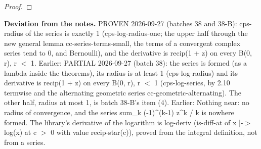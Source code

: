 \begin{proof}
%
%
\end{proof}
%
\noindent\textbf{Deviation from the notes.} PROVEN 2026-09-27 (batches 38 and 38-B): cps-radius of the series is exactly 1 (cps-log-radius-one; the upper half through the new general lemma cc-series-terms-small, the terms of a convergent complex series tend to 0, and Bernoulli), and the derivative is recip(1 + z) on every B(0, r), r $<$ 1. Earlier: PARTIAL 2026-09-27 (batch 38): the series is formed (as a lambda inside the theorems), its radius is at least 1 (cps-log-radius) and its derivative is recip(1 + z) on every B(0, r), r $<$ 1 (cps-log-series, by 2.10 termwise and the alternating geometric series cc-geometric-alternating). The other half, radius at most 1, is batch 38-B's item (4). Earlier: Nothing near: no radius of convergence, and the series sum\_k (-1)\textasciicircum{}(k-1) z\textasciicircum{}k / k is nowhere formed. The library's derivative of the logarithm is log-deriv (is-diff-at of x |-$>$ log(x) at c $>$ 0 with value recip-star(c)), proved from the integral definition, not from a series.
%
\renewcommand{\thethm}{2.21}
